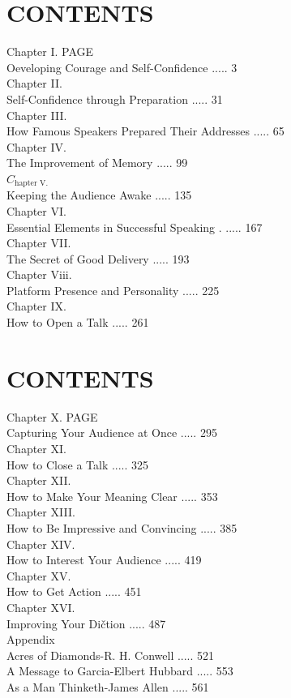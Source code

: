 \documentclass[10pt]{article}
\begin{document}
\section*{CONTENTS}
Chapter I. PAGE\\
Oeveloping Courage and Self-Confidence ..... 3\\
Chapter II.\\
Self-Confidence through Preparation ..... 31\\
Chapter III.\\
How Famous Speakers Prepared Their Addresses ..... 65\\
Chapter IV.\\
The Improvement of Memory ..... 99\\
$C_{\text {hapter V. }}$\\
Keeping the Audience Awake ..... 135\\
Chapter VI.\\
Essential Elements in Successful Speaking . ..... 167\\
Chapter VII.\\
The Secret of Good Delivery ..... 193\\
Chapter Viii.\\
Platform Presence and Personality ..... 225\\
Chapter IX.\\
How to Open a Talk ..... 261

\section*{CONTENTS}
Chapter X. PAGE\\
Capturing Your Audience at Once ..... 295\\
Chapter XI.\\
How to Close a Talk ..... 325\\
Chapter XII.\\
How to Make Your Meaning Clear ..... 353\\
Chapter XIII.\\
How to Be Impressive and Convincing ..... 385\\
Chapter XIV.\\
How to Interest Your Audience ..... 419\\
Chapter XV.\\
How to Get Action ..... 451\\
Chapter XVI.\\
Improving Your Dičtion ..... 487\\
Appendix\\
Acres of Diamonds-R. H. Conwell ..... 521\\
A Message to Garcia-Elbert Hubbard ..... 553\\
As a Man Thinketh-James Allen ..... 561
\end{document}

